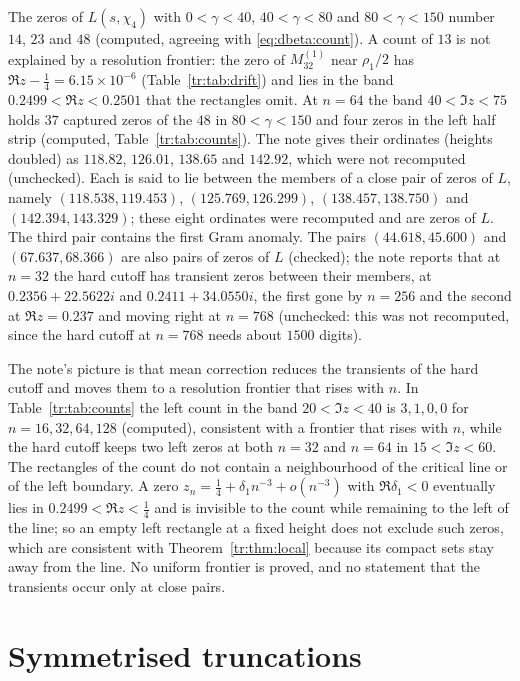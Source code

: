 The zeros of $L(s,\chi_4)$ with $0<\gamma<40$, $40<\gamma<80$ and $80<\gamma<150$ number $14$, $23$ and $48$ (computed, agreeing with \eqref{eq:dbeta:count}). A count of $13$ is not explained by a resolution frontier: the zero of $M_{32}^{(1)}$ near $\rho_1/2$ has $\Re z-\frac14=6.15\times10^{-6}$ (Table~\ref{tr:tab:drift}) and lies in the band $0.2499<\Re z<0.2501$ that the rectangles omit. At $n=64$ the band $40<\Im z<75$ holds $37$ captured zeros of the $48$ in $80<\gamma<150$ and four zeros in the left half strip (computed, Table~\ref{tr:tab:counts}). The note gives their ordinates (heights doubled) as $118.82$, $126.01$, $138.65$ and $142.92$, which were not recomputed (unchecked). Each is said to lie between the members of a close pair of zeros of $L$, namely $(118.538,119.453)$, $(125.769,126.299)$, $(138.457,138.750)$ and $(142.394,143.329)$; these eight ordinates were recomputed and are zeros of $L$. The third pair contains the first Gram anomaly. The pairs $(44.618,45.600)$ and $(67.637,68.366)$ are also pairs of zeros of $L$ (checked); the note reports that at $n=32$ the hard cutoff has transient zeros between their members, at $0.2356+22.5622i$ and $0.2411+34.0550i$, the first gone by $n=256$ and the second at $\Re z=0.237$ and moving right at $n=768$ (unchecked: this was not recomputed, since the hard cutoff at $n=768$ needs about $1500$ digits).

The note's picture is that mean correction reduces the transients of the hard cutoff and moves them to a resolution frontier that rises with $n$. In Table~\ref{tr:tab:counts} the left count in the band $20<\Im z<40$ is $3,1,0,0$ for $n=16,32,64,128$ (computed), consistent with a frontier that rises with $n$, while the hard cutoff keeps two left zeros at both $n=32$ and $n=64$ in $15<\Im z<60$. The rectangles of the count do not contain a neighbourhood of the critical line or of the left boundary. A zero $z_n=\frac14+\delta_1n^{-3}+o(n^{-3})$ with $\Re\delta_1<0$ eventually lies in $0.2499<\Re z<\frac14$ and is invisible to the count while remaining to the left of the line; so an empty left rectangle at a fixed height does not exclude such zeros, which are consistent with Theorem~\ref{tr:thm:local} because its compact sets stay away from the line. No uniform frontier is proved, and no statement that the transients occur only at close pairs.

\section{Symmetrised truncations}\label{tr:sec:sym}

